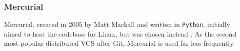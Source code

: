 
\subsubsection{Mercurial}
\label{sec:mercurial}
Mercurial, created in 2005 by Matt Mackall and written in \lstinline{Python}, initially aimed to host the codebase for Linux, but  was chosen instead \cite{stopak_2019}. As the second most popular distributed VCS after Git, Mercurial is used far less frequently.
